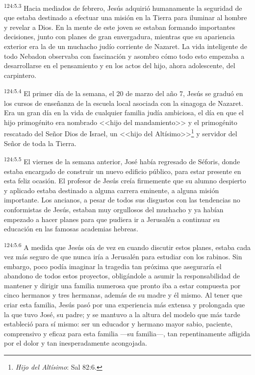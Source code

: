 \par 
\textsuperscript{124:5.3} Hacia mediados de febrero, Jesús adquirió humanamente la seguridad de que estaba destinado a efectuar una misión en la Tierra para iluminar al hombre y revelar a Dios. En la mente de este joven se estaban formando importantes decisiones, junto con planes de gran envergadura, mientras que su apariencia exterior era la de un muchacho judío corriente de Nazaret. La vida inteligente de todo Nebadon observaba con fascinación y asombro cómo todo esto empezaba a desarrollarse en el pensamiento y en los actos del hijo, ahora adolescente, del carpintero.

\par 
\textsuperscript{124:5.4} El primer día de la semana, el 20 de marzo del año 7, Jesús se graduó en los cursos de enseñanza de la escuela local asociada con la sinagoga de Nazaret. Era un gran día en la vida de cualquier familia judía ambiciosa, el día en que el hijo primogénito era nombrado <<hijo del mandamiento>> y el primogénito rescatado del Señor Dios de Israel, un <<hijo del Altísimo>>\footnote{\textit{Hijo del Altísimo}: Sal 82:6.} y servidor del Señor de toda la Tierra.

\par 
\textsuperscript{124:5.5} El viernes de la semana anterior, José había regresado de Séforis, donde estaba encargado de construir un nuevo edificio público, para estar presente en esta feliz ocasión. El profesor de Jesús creía firmemente que su alumno despierto y aplicado estaba destinado a alguna carrera eminente, a alguna misión importante. Los ancianos, a pesar de todos sus disgustos con las tendencias no conformistas de Jesús, estaban muy orgullosos del muchacho y ya habían empezado a hacer planes para que pudiera ir a Jerusalén a continuar su educación en las famosas academias hebreas.

\par 
\textsuperscript{124:5.6} A medida que Jesús oía de vez en cuando discutir estos planes, estaba cada vez más seguro de que nunca iría a Jerusalén para estudiar con los rabinos. Sin embargo, poco podía imaginar la tragedia tan próxima que aseguraría el abandono de todos estos proyectos, obligándole a asumir la responsabilidad de mantener y dirigir una familia numerosa que pronto iba a estar compuesta por cinco hermanos y tres hermanas, además de su madre y él mismo. Al tener que criar esta familia, Jesús pasó por una experiencia más extensa y prolongada que la que tuvo José, su padre; y se mantuvo a la altura del modelo que más tarde estableció para sí mismo: ser un educador y hermano mayor sabio, paciente, comprensivo y eficaz para esta familia ---su familia---, tan repentinamente afligida por el dolor y tan inesperadamente acongojada.

